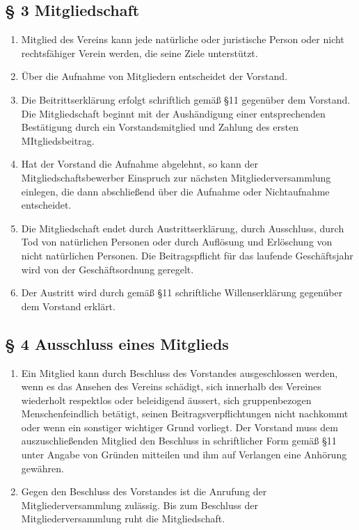 \documentclass[10pt,a4paper]{scrartcl}
\begin{document}
\subsection*{§ 3 Mitgliedschaft}
\begin{enumerate}
	\item Mitglied des Vereins kann jede natürliche oder juristische Person oder
		nicht rechts\-fähiger Verein werden, die seine Ziele unterstützt.
	\item Über die Aufnahme von Mitgliedern entscheidet der Vorstand.
	\item Die Beitrittserklärung erfolgt schriftlich gemäß §11 gegenüber dem Vorstand. Die
		Mitgliedschaft beginnt mit der Aushändigung einer entsprechenden Bestätigung durch
		ein Vorstandsmitglied und Zahlung des ersten MItgliedsbeitrag.
	\item Hat der Vorstand die Aufnahme abgelehnt, so kann der Mitgliedschaftsbewerber Einspruch
		zur nächsten Mitgliederversammlung einlegen, die dann abschließend über die Aufnahme
		oder Nichtaufnahme entscheidet.
	\item Die Mitgliedschaft endet durch Austrittserklärung, durch Ausschluss, durch Tod von
		natür\-li\-chen Personen oder durch Auflösung und Erlöschung von nicht
		natür\-lichen Personen.
		Die Beitragspflicht für das laufende Geschäftsjahr wird von der Geschäftsordnung
		geregelt.
	\item Der Austritt wird durch gemäß §11 schriftliche Willenserklärung gegenüber dem Vorstand
		erklärt.
\end{enumerate}
\subsection*{§ 4 Ausschluss eines Mitglieds }
\begin{enumerate}
	\item Ein Mitglied kann durch Beschluss des Vorstandes ausgeschlossen werden, wenn es das
		Ansehen des Vereins schädigt, sich innerhalb des Vereines wiederholt respektlos oder beleidigend äussert, sich gruppenbezogen Menschenfeindlich betätigt, seinen Beitragsverpflichtungen nicht nachkommt oder
		wenn ein sonstiger wichtiger Grund vorliegt. Der Vorstand muss dem auszuschließenden
		Mitglied den Beschluss in schriftlicher Form gemäß §11 unter Angabe von Gründen
		mitteilen und ihm auf Verlangen eine Anhörung gewähren.
	\item Gegen den Beschluss des Vorstandes ist die Anrufung der Mitgliederversammlung
		zu\-läs\-sig. Bis zum Beschluss der Mitgliederversammlung ruht die Mitgliedschaft.
	
\end{enumerate}
\end{document}
